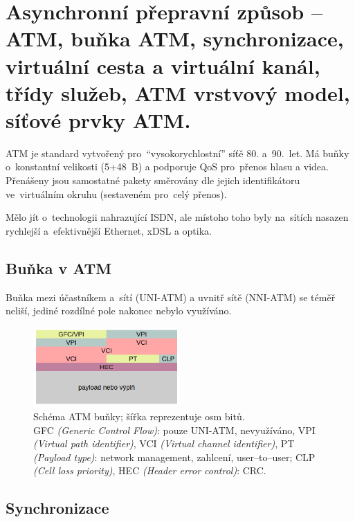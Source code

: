 \clearpage
\section{Asynchronní přepravní způsob -- ATM, buňka ATM, synchronizace, virtuální cesta a virtuální kanál, třídy služeb, ATM vrstvový model, síťové prvky ATM.}

ATM je standard vytvořený pro~\enquote{vysokorychlostní} síťě 80. a~90.~let.
Má buňky o~konstantní velikosti (5+48~B) a podporuje QoS pro~přenos hlasu a videa.
Přenášeny jsou samostatné pakety směrovány dle jejich identifikátoru ve~virtuálním okruhu (sestaveném pro~celý přenos).

Mělo jít o~technologii nahrazující ISDN, ale místoho toho byly na~sítích nasazen rychlejší a~efektivnější Ethernet, xDSL a optika.


\subsection{Buňka v ATM}

Buňka mezi účastníkem a~sítí (UNI-ATM) a uvnitř sítě (NNI-ATM) se téměř neliší, jediné rozdílné pole nakonec nebylo využíváno.

\begin{figure}[h]
    \centering
    \onehalfspacing
    \includegraphics[width=0.5\textwidth]{snimky/atm-bunka}
    \caption{
        Schéma ATM buňky; šířka reprezentuje osm bitů. \\
        GFC \emph{(Generic Control Flow)}: pouze UNI-ATM, nevyužíváno,
        VPI \emph{(Virtual path identifier)},
        VCI \emph{(Virtual channel identifier)},
        PT \emph{(Payload type)}: network management, zahlcení, user--to--user;
        CLP \emph{(Cell loss priority)},
        HEC \emph{(Header error control)}: CRC.
    }
    \label{fig:atm-bunka}
\end{figure}


\subsection{Synchronizace}

